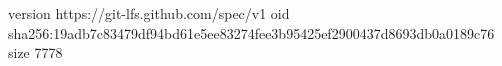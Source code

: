 version https://git-lfs.github.com/spec/v1
oid sha256:19adb7c83479df94bd61e5ee83274fee3b95425ef2900437d8693db0a0189c76
size 7778
